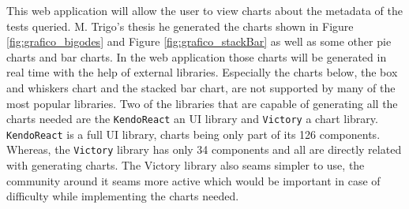 \documentclass[runningheads]{llncs}
\begin{document}
This web application will allow the user to view charts about the metadata of the tests queried. M. Trigo's thesis he generated the charts shown in Figure \ref{fig:grafico_bigodes} and Figure \ref{fig:grafico_stackBar} as well as some other pie charts and bar charts. In the web application those charts will be generated in real time with the help of external libraries. Especially the charts below, the box and whiskers chart and the stacked bar chart, are not supported by many of the most popular libraries. Two of the libraries that are capable of generating all the charts needed are the \texttt{KendoReact}\cite{KendoReact} an UI library and \texttt{Victory}\cite{Victory} a chart library. \texttt{KendoReact} is a full UI library, charts being only part of its 126 components. Whereas, the \texttt{Victory} library has only 34 components and all are directly related with generating charts. The Victory library also seams simpler to use, the community around it seams more active which would be important in case of difficulty while implementing the charts needed.
\end{document}
